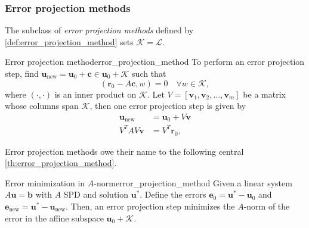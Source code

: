\subsubsection{Error projection methods}
The subclass of \textit{error projection methods} defined by \cref{def:error_projection_method} sets $\mathcal{K} = \mathcal{L}$.
\begin{fancydef}{Error projection method}{error_projection_method}
  To perform an error projection step, find $\mathbf{u}_{\text{new}} = \mathbf{u}_0 + \mathbf{c} \in \mathbf{u}_0 + \mathcal{K}$ such that
  \begin{equation}
    (\mathbf{r}_0 - A\mathbf{c}, w) = 0 \quad \forall w \in \mathcal{K},
    \label{eq:orthogonality_condition}
  \end{equation}
  where $(\cdot,\cdot)$ is an inner product on $\mathcal{K}$. Let $V = [\mathbf{v}_1, \mathbf{v}_2, \dots, \mathbf{v}_m]$ be a matrix whose columns span $\mathcal{K}$, then one error projection step is given by
  \begin{align*}
    \mathbf{u}_{\text{new}} & = \mathbf{u}_0 + V \mathbf{v} \\
    V^TAV\mathbf{v} & = V^T\mathbf{r}_0,
  \end{align*}
\end{fancydef}
Error projection methods owe their name to the following central \cref{th:error_projection_method}.
\begin{fancyth}{Error minimization in $A$-norm}{error_projection_method}
  Given a linear system $A\mathbf{u} = \mathbf{b}$ with $A$ SPD and solution $\mathbf{u}^{*}$. Define the errors $\mathbf{e}_0 = \mathbf{u}^{*} - \mathbf{u}_0$ and $\mathbf{e}_{\text{new}} = \mathbf{u}^{*} - \mathbf{u}_{\text{new}}$. Then, an error projection step minimizes the $A$-norm of the error in the affine subspace $\mathbf{u}_0 + \mathcal{K}$.
\end{fancyth}
